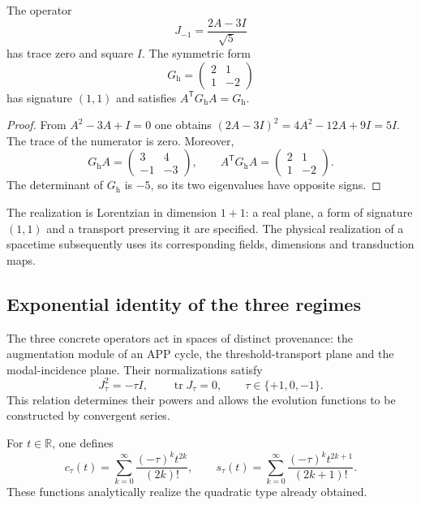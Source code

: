 \begin{proposicion}
\label{eul:prop:hiperbolico}
The operator
\[
 J_{-1}=\frac{2A-3I}{\sqrt5}
\]
has trace zero and square \(I\). The symmetric form
\[
 G_{\mathrm h}=\begin{pmatrix}2&1\\1&-2\end{pmatrix}
\]
has signature \((1,1)\) and satisfies
\(A^\mathsf TG_{\mathrm h}A=G_{\mathrm h}\).
\end{proposicion}
\begin{proof}
From \(A^2-3A+I=0\) one obtains
\((2A-3I)^2=4A^2-12A+9I=5I\). The trace of the numerator is zero.
Moreover,
\[
 G_{\mathrm h}A=\begin{pmatrix}3&4\\-1&-3\end{pmatrix},
 \qquad
 A^\mathsf TG_{\mathrm h}A
 =\begin{pmatrix}2&1\\1&-2\end{pmatrix}.
\]
The determinant of \(G_{\mathrm h}\) is \(-5\), so its two
eigenvalues have opposite signs.
\end{proof}

The realization is Lorentzian in dimension \(1+1\): a real plane,
a form of signature \((1,1)\) and a transport preserving it
are specified. The physical realization of a spacetime subsequently uses
its corresponding fields, dimensions and transduction maps.

\subsection{Exponential identity of the three regimes}
\label{eul:identidad}

The three concrete operators act in spaces of distinct provenance:
the augmentation module of an APP cycle, the threshold-transport plane
and the modal-incidence plane. Their normalizations satisfy
\[
 J_\tau^2=-\tau I,\qquad \operatorname{tr}J_\tau=0,
 \qquad \tau\in\{+1,0,-1\}.
\]
This relation determines their powers and allows the evolution
functions to be constructed by convergent series.

\begin{definicion}
For \(t\in\mathbb R\), one defines
\[
 c_\tau(t)=\sum_{k=0}^{\infty}
       \frac{(-\tau)^kt^{2k}}{(2k)!},\qquad
 s_\tau(t)=\sum_{k=0}^{\infty}
       \frac{(-\tau)^kt^{2k+1}}{(2k+1)!}.
\]
These functions analytically realize the quadratic type already obtained.
\end{definicion}

